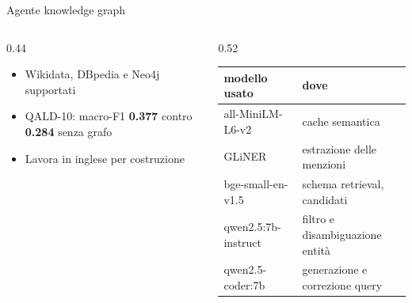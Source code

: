 \documentclass[aspectratio=169,11pt]{beamer}
\begin{document}
\begin{frame}{Agente knowledge graph}
\begin{columns}[t,onlytextwidth]
\begin{column}{0.44\textwidth}
\scriptsize
\vspace{-3.5em}
\begin{itemize}\setlength\itemsep{1pt}
  \item Wikidata, DBpedia e Neo4j supportati
  \item QALD-10: macro-F1 \textbf{0.377} contro \textbf{0.284} senza grafo
  \item Lavora in inglese per costruzione
\end{itemize}
\end{column}
\begin{column}{0.52\textwidth}
\centering\scriptsize\renewcommand{\arraystretch}{0.95}
\begin{tabular}{@{}ll@{}}
\toprule
\textbf{modello usato} & \textbf{dove} \\
\midrule
all-MiniLM-L6-v2 & cache semantica \\
GLiNER & estrazione delle menzioni \\
bge-small-en-v1.5 & schema retrieval, candidati \\
qwen2.5:7b-instruct & filtro e disambiguazione entità \\
qwen2.5-coder:7b & generazione e correzione query \\
\bottomrule
\end{tabular}
\end{column}
\end{columns}
\end{frame}
\end{document}
